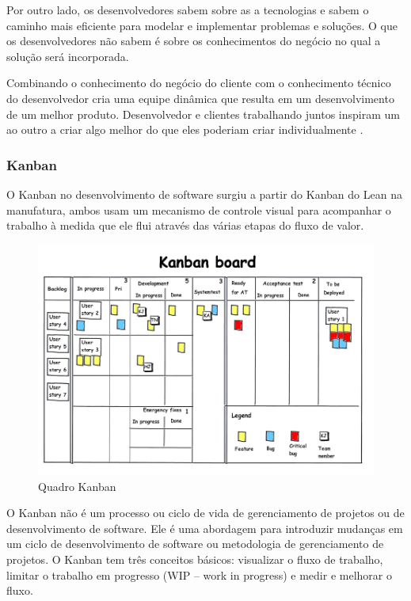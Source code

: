 Por outro lado, os desenvolvedores sabem sobre as a tecnologias e sabem o caminho mais eficiente para modelar e implementar problemas e soluções. O que os desenvolvedores não sabem é sobre os conhecimentos do negócio no qual a solução será incorporada. 

Combinando o conhecimento do negócio do cliente com o conhecimento técnico do desenvolvedor cria uma equipe dinâmica que resulta em um desenvolvimento de um melhor produto. Desenvolvedor e clientes trabalhando juntos inspiram um ao outro a criar algo melhor do que eles poderiam criar individualmente \cite{hibbs2009}.


\subsubsection[Kanban]{Kanban}

O Kanban no desenvolvimento de software surgiu a partir do Kanban do Lean na manufatura, ambos usam um mecanismo de controle visual para acompanhar o trabalho à medida que ele flui através das várias etapas do fluxo de valor. 

\begin{figure}[h]
		\centering
		\label{fig05}
			\includegraphics[scale=0.7]{figuras/kanban.png}
		\caption{Quadro Kanban \cite{kanban}}
\end{figure}

O Kanban não é um processo ou ciclo de vida de gerenciamento de projetos ou de desenvolvimento de software. Ele é uma abordagem para introduzir mudanças em um ciclo de desenvolvimento de software ou metodologia de gerenciamento de projetos. O Kanban tem três conceitos básicos: visualizar o fluxo de trabalho, limitar o trabalho em progresso (WIP – work in progress) e medir e melhorar o fluxo. 

